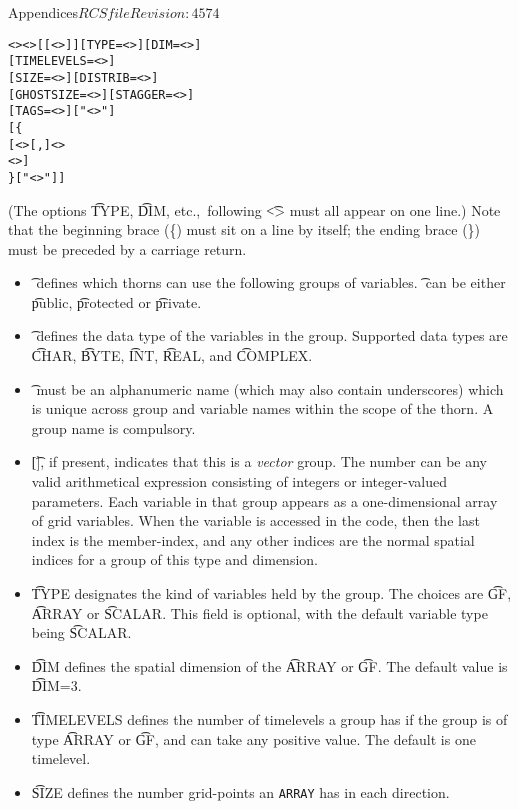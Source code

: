 \begin{cactuspart}{Appendices}{$RCSfile$}{$Revision: 4574 $}
\begin{alltt}
<> <>[[<>]] [TYPE=<>] [DIM=<>]
[TIMELEVELS=<>]
[SIZE=<>] [DISTRIB=<>]
[GHOSTSIZE=<>] [STAGGER=<>]
[TAGS=<>]  ["<>"]
[\{
 [ <>[,]<>
   <> ]
\} ["<>"] ]
\end{alltt}
%
(The options {\t TYPE}, {\t DIM}, etc.,\ following {\t <>}
must all appear on one line.)  Note that the beginning brace (\{) must
sit on a line by itself; the ending brace (\}) must be preceded by a
carriage return.
%
\begin{itemize}
\item{} {\t {}} defines which thorns can use the following
        groups of variables. {\t {}} can be either
        {\t public}, {\t protected} or {\t private}.
\item{} {\t {}} defines the data type of the variables in the
group.  Supported data types are {\t CHAR}, {\t BYTE}, {\t INT}, {\t REAL}, and
{\t COMPLEX}. 
\item{} {\t {}} must be an alphanumeric name (which may also
contain underscores) which is unique across group and variable names
within the scope of the thorn. A group name is compulsory.
\item{} {\t []}, if present, indicates that this is a
  \emph{vector} group.  The number can be any valid arithmetical
  expression consisting of integers or integer-valued parameters.
  Each variable in that group appears as a one-dimensional array of
  grid variables.  When the variable is accessed in the code, then the
  last index is the member-index, and any other indices are the normal
  spatial indices for a group of this type and dimension.
\item{} {\t TYPE} designates the kind of variables held by the group.
The choices are {\t GF}, {\t ARRAY} or {\t SCALAR}. This field is
optional, with the default variable type being {\t SCALAR}.
\item{} {\t DIM} defines the spatial dimension of the {\t ARRAY} or
{\t GF}.  The default value is {\t DIM=3}.
\item{} {\t TIMELEVELS} defines the number of timelevels a group has if
        the group is of type {\t ARRAY} or {\t GF}, and can take any positive
        value. The default is one timelevel.
\item{} {\t SIZE} defines the number grid-points an {\tt ARRAY} has in each direction.

\end{itemize}
\end{cactuspart}
